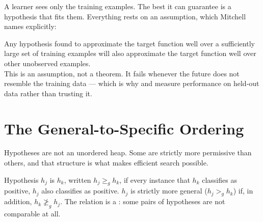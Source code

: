 A learner sees only the training examples. The best it can guarantee is a
hypothesis that fits them. Everything rests on an assumption, which Mitchell
names explicitly:

\begin{conceptbox}
Any hypothesis found to approximate the target function well over a sufficiently
large set of training examples will also approximate the target function well
over other unobserved examples.\\[3pt]
This is an assumption, not a theorem. It fails whenever the future does not
resemble the training data --- which is why  and
 measure performance on held-out data rather than trusting it.
\end{conceptbox}

\section{The General-to-Specific Ordering}

Hypotheses are not an unordered heap. Some are strictly more permissive than
others, and that structure is what makes efficient search possible.

\begin{definitionbox}
Hypothesis $h_j$ is  $h_k$, written
$h_j \ge_g h_k$, if every instance that $h_k$ classifies as positive, $h_j$ also
classifies as positive. $h_j$ is strictly more general ($h_j >_g h_k$) if, in
addition, $h_k \not\ge_g h_j$. The relation is a : some
pairs of hypotheses are not comparable at all.
\end{definitionbox}

